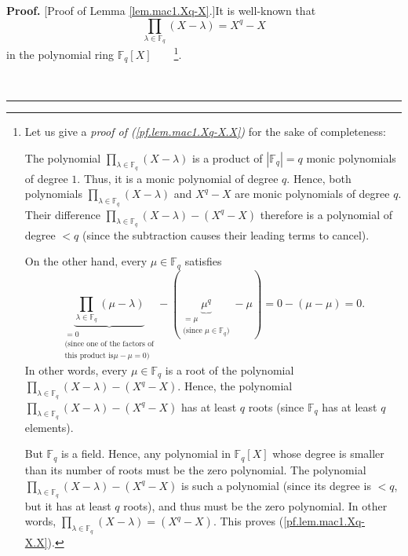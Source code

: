 \documentclass[numbers=enddot,12pt,final,onecolumn,notitlepage]{scrartcl}%
\theoremstyle{definition}
\newenvironment{proof}[1][Proof]{\noindent\textbf{#1.} }{\ \rule{0.5em}{0.5em}}
\let\prodnonlimits\prod
\renewcommand{\prod}{\prodnonlimits\limits}
\begin{document}
\begin{proof}
[Proof of Lemma \ref{lem.mac1.Xq-X}.]It is well-known that
\begin{equation}
\prod_{\lambda\in\mathbb{F}_{q}}\left(  X-\lambda\right)  =X^{q}-X
\label{pf.lem.mac1.Xq-X.X}%
\end{equation}
in the polynomial ring $\mathbb{F}_{q}\left[  X\right]  $\ \ \ \ \footnote{Let
us give a \textit{proof of (\ref{pf.lem.mac1.Xq-X.X})} for the sake of
completeness:
\par
The polynomial $\prod_{\lambda\in\mathbb{F}_{q}}\left(  X-\lambda\right)  $ is
a product of $\left\vert \mathbb{F}_{q}\right\vert =q$ monic polynomials of
degree $1$. Thus, it is a monic polynomial of degree $q$. Hence, both
polynomials $\prod_{\lambda\in\mathbb{F}_{q}}\left(  X-\lambda\right)  $ and
$X^{q}-X$ are monic polynomials of degree $q$. Their difference $\prod
_{\lambda\in\mathbb{F}_{q}}\left(  X-\lambda\right)  -\left(  X^{q}-X\right)
$ therefore is a polynomial of degree $<q$ (since the subtraction causes their
leading terms to cancel).
\par
On the other hand, every $\mu\in\mathbb{F}_{q}$ satisfies%
\[
\underbrace{\prod_{\lambda\in\mathbb{F}_{q}}\left(  \mu-\lambda\right)
}_{\substack{=0\\\text{(since one of the factors of}\\\text{this product is
}\mu-\mu=0\text{)}}}-\left(  \underbrace{\mu^{q}}_{\substack{=\mu
\\\text{(since }\mu\in\mathbb{F}_{q}\text{)}}}-\mu\right)  =0-\left(  \mu
-\mu\right)  =0.
\]
In other words, every $\mu\in\mathbb{F}_{q}$ is a root of the polynomial
$\prod_{\lambda\in\mathbb{F}_{q}}\left(  X-\lambda\right)  -\left(
X^{q}-X\right)  $. Hence, the polynomial $\prod_{\lambda\in\mathbb{F}_{q}%
}\left(  X-\lambda\right)  -\left(  X^{q}-X\right)  $ has at least $q$ roots
(since $\mathbb{F}_{q}$ has at least $q$ elements).
\par
But $\mathbb{F}_{q}$ is a field. Hence, any polynomial in $\mathbb{F}%
_{q}\left[  X\right]  $ whose degree is smaller than its number of roots must
be the zero polynomial. The polynomial $\prod_{\lambda\in\mathbb{F}_{q}%
}\left(  X-\lambda\right)  -\left(  X^{q}-X\right)  $ is such a polynomial
(since its degree is $<q$, but it has at least $q$ roots), and thus must be
the zero polynomial. In other words, $\prod_{\lambda\in\mathbb{F}_{q}}\left(
X-\lambda\right)  =\left(  X^{q}-X\right)  $. This proves
(\ref{pf.lem.mac1.Xq-X.X}).}.


\end{proof}
\end{document}
